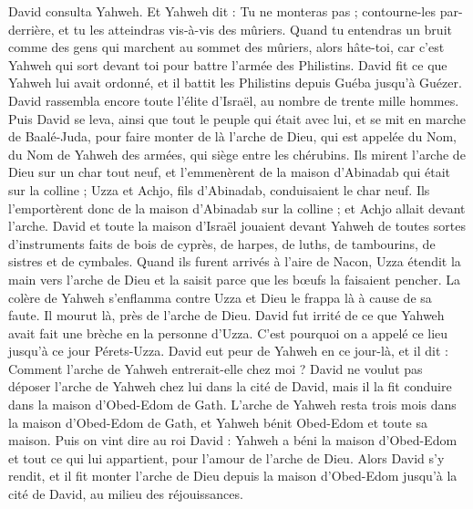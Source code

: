 \begin{multicols}{2}
David consulta Yahweh. Et Yahweh dit : Tu ne monteras pas ; contourne-les par-derrière, et tu les atteindras vis-à-vis des mûriers.
Quand tu entendras un bruit comme des gens qui marchent au sommet des mûriers, alors hâte-toi, car c'est Yahweh qui sort devant toi pour battre l'armée des Philistins.
David fit ce que Yahweh lui avait ordonné, et il battit les Philistins depuis Guéba jusqu'à Guézer.
\VerseOne{}David rassembla encore toute l'élite d'Israël, au nombre de trente mille hommes.
Puis David se leva, ainsi que tout le peuple qui était avec lui, et se mit en marche de Baalé-Juda, pour faire monter de là l'arche de Dieu, qui est appelée du Nom, du Nom de Yahweh des armées, qui siège entre les chérubins.
Ils mirent l'arche de Dieu sur un char tout neuf, et l'emmenèrent de la maison d'Abinadab qui était sur la colline ; Uzza et Achjo, fils d'Abinadab, conduisaient le char neuf.
Ils l'emportèrent donc de la maison d'Abinadab sur la colline ; et Achjo allait devant l'arche.
David et toute la maison d'Israël jouaient devant Yahweh de toutes sortes d'instruments faits de bois de cyprès, de harpes, de luths, de tambourins, de sistres et de cymbales.
Quand ils furent arrivés à l'aire de Nacon, Uzza étendit la main vers l'arche de Dieu et la saisit parce que les bœufs la faisaient pencher.
La colère de Yahweh s'enflamma contre Uzza et Dieu le frappa là à cause de sa faute. Il mourut là, près de l'arche de Dieu.
David fut irrité de ce que Yahweh avait fait une brèche en la personne d'Uzza. C'est pourquoi on a appelé ce lieu jusqu'à ce jour Pérets-Uzza.
David eut peur de Yahweh en ce jour-là, et il dit : Comment l'arche de Yahweh entrerait-elle chez moi ?
David ne voulut pas déposer l'arche de Yahweh chez lui dans la cité de David, mais il la fit conduire dans la maison d'Obed-Edom de Gath.
L'arche de Yahweh resta trois mois dans la maison d'Obed-Edom de Gath, et Yahweh bénit Obed-Edom et toute sa maison.
Puis on vint dire au roi David : Yahweh a béni la maison d'Obed-Edom et tout ce qui lui appartient, pour l'amour de l'arche de Dieu. Alors David s'y rendit, et il fit monter l'arche de Dieu depuis la maison d'Obed-Edom jusqu'à la cité de David, au milieu des réjouissances.

\end{multicols}
